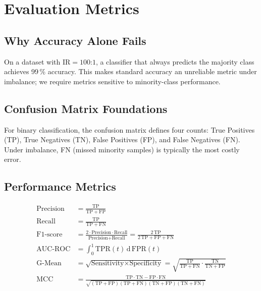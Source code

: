 \documentclass[11pt,a4paper]{article}
\newcommand{\IR}{\mathrm{IR}}
\begin{document}
\section{Evaluation Metrics}

\subsection{Why Accuracy Alone Fails}

On a dataset with $\IR = 100$:$1$, a classifier that always predicts the majority class
achieves 99\,\% accuracy. This makes standard accuracy an unreliable metric under imbalance;
we require metrics sensitive to minority-class performance.

\subsection{Confusion Matrix Foundations}

For binary classification, the confusion matrix defines four counts: True Positives (TP),
True Negatives (TN), False Positives (FP), and False Negatives (FN). Under imbalance,
FN (missed minority samples) is typically the most costly error.

\subsection{Performance Metrics}

\begin{align}
  \text{Precision} &= \frac{\mathrm{TP}}{\mathrm{TP}+\mathrm{FP}} \label{eq:prec}\\[4pt]
  \text{Recall} &= \frac{\mathrm{TP}}{\mathrm{TP}+\mathrm{FN}} \label{eq:rec}\\[4pt]
  \text{F1-score} &= \frac{2\cdot\text{Precision}\cdot\text{Recall}}{\text{Precision}+\text{Recall}}
                 = \frac{2\,\mathrm{TP}}{2\,\mathrm{TP}+\mathrm{FP}+\mathrm{FN}} \label{eq:f1}\\[4pt]
  \text{AUC-ROC} &= \int_0^1 \mathrm{TPR}(t)\,\mathrm{d}\,\mathrm{FPR}(t) \label{eq:auc}\\[4pt]
  \text{G-Mean} &= \sqrt{\text{Sensitivity}\times\text{Specificity}}
                = \sqrt{\frac{\mathrm{TP}}{\mathrm{TP}+\mathrm{FN}}\cdot\frac{\mathrm{TN}}{\mathrm{TN}+\mathrm{FP}}}
                \label{eq:gmean}\\[4pt]
  \text{MCC} &= \frac{\mathrm{TP}\cdot\mathrm{TN}-\mathrm{FP}\cdot\mathrm{FN}}
               {\sqrt{(\mathrm{TP}+\mathrm{FP})(\mathrm{TP}+\mathrm{FN})(\mathrm{TN}+\mathrm{FP})(\mathrm{TN}+\mathrm{FN})}}
               \label{eq:mcc}
\end{align}
\end{document}
